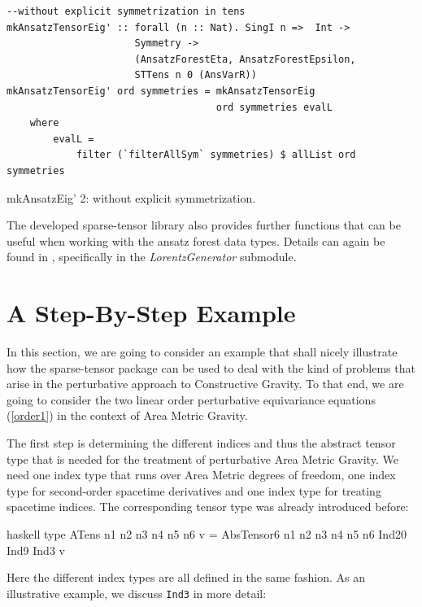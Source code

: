 \documentclass[a4paper,12pt, DIV=14, BCOR=5mm, twoside, headsepline, numbers=noenddot]{scrbook}
\begin{document}
\begin{listing}[hbt!]
\begin{verbatim}
--without explicit symmetrization in tens
mkAnsatzTensorEig' :: forall (n :: Nat). SingI n =>  Int ->
                      Symmetry ->
                      (AnsatzForestEta, AnsatzForestEpsilon,
                      STTens n 0 (AnsVarR))
mkAnsatzTensorEig' ord symmetries = mkAnsatzTensorEig
                                    ord symmetries evalL
    where
        evalL =
            filter (`filterAllSym` symmetries) $ allList ord symmetries
\end{verbatim} 
\caption{mkAnsatzEig' 2: without explicit symmetrization.}\label{mkAnsatzEig2'}
\end{listing}

The developed sparse-tensor library also provides further functions that can be useful when working with the ansatz forest data types. Details can again be found in \cite{sparse-tensor}, specifically in the \textit{LorentzGenerator} submodule. 

\section{A Step-By-Step Example}
In this section, we are going to consider an example that shall nicely illustrate how the sparse-tensor package can be used to deal with the kind of problems that arise in the perturbative approach to Constructive Gravity. To that end, we are going to consider the two linear order perturbative equivariance equations (\ref{order1}) in the context of Area Metric Gravity. 

The first step is determining the different indices and thus the abstract tensor type that is needed for the treatment of perturbative Area Metric Gravity. 
We need one index type that runs over Area Metric degrees of freedom, one index type for second-order spacetime derivatives and one index type for treating spacetime indices. The corresponding tensor type was already introduced before:

\begin{center}
\begin{cminted}{haskell}
type ATens n1 n2 n3 n4 n5 n6 v = 
     AbsTensor6 n1 n2 n3 n4 n5 n6 Ind20 Ind9 Ind3 v
\end{cminted}
\end{center}

Here the different index types are all defined in the same fashion. As an illustrative example, we discuss \texttt{Ind3} in more detail:
\end{document}

